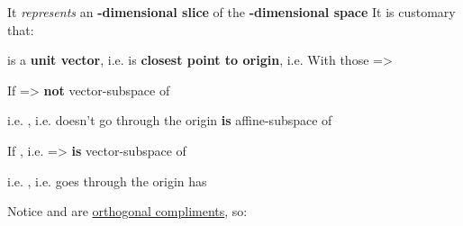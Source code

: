 \begin{itemize}

      \vItem
            It \emph{represents} an \textbf{-dimensional slice} of
            the \textbf{-dimensional space}
      \vItem
            It is customary that:

            \begin{itemize}

                  \vItem
                         is a \textbf{unit vector},
                        i.e. 
                  \vItem
                         is \textbf{closest point to origin},
                        i.e. 
                  \vItem
                        With those =>
            \end{itemize}
      \vItem
            If 
            =>  \textbf{not} vector-subspace of 

            \begin{itemize}

                  \vItem
                        i.e. , i.e.  doesn't go through the origin
                  \vItem
                         \textbf{is} affine-subspace of 
            \end{itemize}
      \vItem
            If , i.e.  =>
             \textbf{is} vector-subspace of 

            \begin{itemize}

                  \vItem
                        i.e. , i.e.  goes through the origin
                  \vItem
                         has 
            \end{itemize}
\end{itemize}

\hSep %

Notice  and  are \underline{orthogonal compliments}, so:


